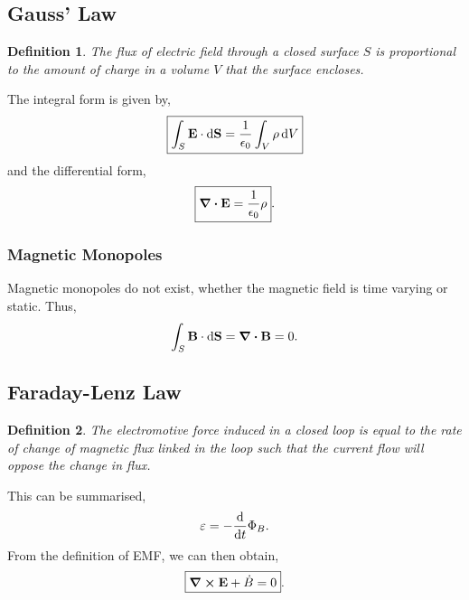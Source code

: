 \documentclass{book}
\newtheorem*{definition}{Definition}
\begin{document}
\subsection{Gauss' Law}
\begin{definition}
	The flux of electric field through a closed surface $S$ is proportional to the amount of charge in a volume $V$ that the surface encloses.
\end{definition}
The integral form is given by,
\begin{equation}
	\boxed{\int_S \vb{E}\cdot\dd{\vb{S}} = \frac{1}{\epsilon_0}\int_V\rho\dd{V}}
\end{equation}
and the differential form,
\begin{equation}
	\boxed{\div{\vb{E}} = \frac{1}{\epsilon_{0}}\rho}.
\end{equation}
\subsubsection{Magnetic Monopoles}
Magnetic monopoles do not exist, whether the magnetic field is time varying or static. Thus,
\begin{equation}
	\int_S\vb{B}\cdot\dd{\vb{S}} = \div{\vb{B}} = 0.
\end{equation}
\subsection{Faraday-Lenz Law}
\begin{definition}
	The electromotive force induced in a closed loop is equal to the rate of change of magnetic flux linked in the loop such that the current flow will oppose the change in flux.
\end{definition}
This can be summarised,
\begin{equation}
	\varepsilon = -\dv{t}\Phi_B.
\end{equation}
From the definition of EMF, we can then obtain,
\begin{equation}
	\boxed{\curl{\vb{E}} + \Dot{B} = 0}.
\end{equation}
\end{document}
